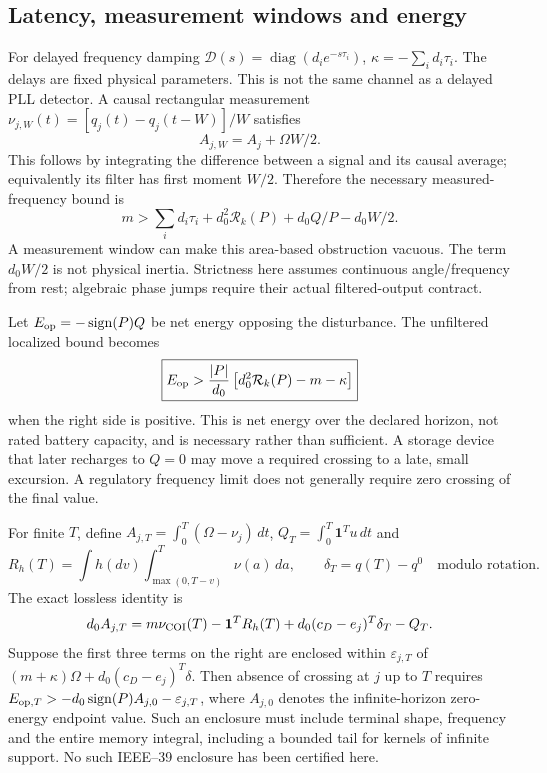 \documentclass[11pt]{article}
\newcommand{\diag}{\operatorname{diag}}
\newcommand{\one}{\mathbf{1}}
\begin{document}
\subsection{Latency, measurement windows and energy}
For delayed frequency damping
$\mathcal D(s)=\diag(d_i e^{-s\tau_i})$,
$\kappa=-\sum_i d_i\tau_i$. The delays are fixed physical parameters.
This is not the same channel as a delayed PLL detector.
A causal rectangular measurement
$\nu_{j,W}(t)=[q_j(t)-q_j(t-W)]/W$ satisfies
\begin{equation}
 A_{j,W}=A_j+\Omega W/2.
 \label{eq:nfl-window}
\end{equation}
This follows by integrating the difference between a signal and its
causal average; equivalently its filter has first moment $W/2$.
Therefore the necessary measured-frequency bound is
\begin{equation}
 \boxed{m>\sum_i d_i\tau_i+d_0^2\mathcal R_k(P)
                        +d_0Q/P-d_0W/2.}
 \label{eq:nfl-delay-window}
\end{equation}
A measurement window can make this area-based obstruction vacuous.
The term $d_0W/2$ is not physical inertia. Strictness here assumes
continuous angle/frequency from rest; algebraic phase jumps require their
actual filtered-output contract.

Let $E_{\rm op}=-\operatorname{sign}(P)Q$ be net energy opposing the
disturbance. The unfiltered localized bound becomes
\begin{equation}
 \boxed{E_{\rm op}>
     \frac{|P|}{d_0}\left[d_0^2\mathcal R_k(P)-m-\kappa\right]}
 \label{eq:nfl-energy}
\end{equation}
when the right side is positive. This is net energy over the declared
horizon, not rated battery capacity, and is necessary rather than sufficient.
A storage device that later recharges to $Q=0$ may move a required crossing
to a late, small excursion. A regulatory frequency limit does not generally
require zero crossing of the final value.

For finite $T$, define
$A_{j,T}=\int_0^T(\Omega-\nu_j)\,dt$,
$Q_T=\int_0^T\one^Tu\,dt$ and
\[
 R_h(T)=\int h(dv)\int_{\max(0,T-v)}^T\nu(a)\,da,\qquad
 \delta_T=q(T)-q^0\quad\text{modulo rotation}.
\]
The exact lossless identity is
\begin{equation}
 d_0A_{j,T}=m\nu_{\rm COI}(T)-\one^TR_h(T)
                   +d_0(c_D-e_j)^T\delta_T-Q_T.
 \label{eq:nfl-finite}
\end{equation}
Suppose the first three terms on the right are enclosed within
$\varepsilon_{j,T}$ of
$(m+\kappa)\Omega+d_0(c_D-e_j)^T\delta$.
Then absence of crossing at $j$ up to $T$ requires
$E_{{\rm op},T}>-d_0\operatorname{sign}(P)A_{j,0}
 -\varepsilon_{j,T}$, where $A_{j,0}$ denotes the infinite-horizon
zero-energy endpoint value. Such an enclosure must include terminal shape,
frequency and the entire memory integral, including a bounded tail for
kernels of infinite support. No such IEEE--39 enclosure
has been certified here.
\end{document}
